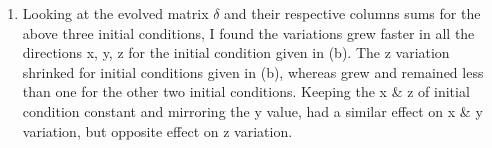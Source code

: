 \documentclass{article}
\begin{document}
\begin{enumerate}[label=(\alph*)]
\item
Looking at the evolved matrix $\delta$ and their respective columns sums for the above three initial conditions, I found the variations grew faster in all the directions x, y, z for the initial condition given in (b). The z variation shrinked for initial conditions given in (b), whereas grew and remained less than one for the other two initial conditions. Keeping the x \& z of initial condition constant and mirroring the y value, had a similar effect on x \& y variation, but opposite effect on z variation. 
\end{enumerate}
\end{document}
